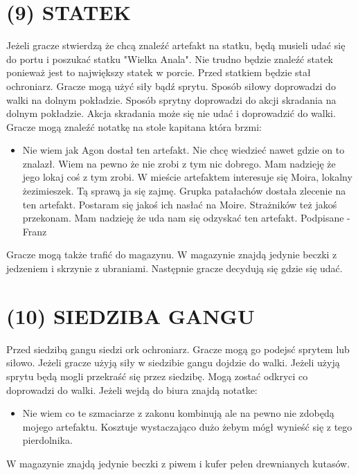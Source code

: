 \documentclass[14pt]{article}
\begin{document}
\section*{(9) STATEK}
\RaggedRight
Jeżeli gracze stwierdzą że chcą znaleźć artefakt na statku, będą musieli udać się do portu i poszukać statku "Wielka Anala". Nie trudno będzie znaleźć statek ponieważ jest to największy statek w porcie. Przed statkiem będzie stał ochroniarz. Gracze mogą użyć siły bądź sprytu. Sposób siłowy doprowadzi do walki na dolnym pokładzie. Sposób sprytny doprowadzi do akcji skradania na dolnym pokładzie. Akcja skradania może się nie udać i doprowadzić do walki. Gracze mogą znaleźć notatkę na stole kapitana która brzmi:
\begin{itemize}
    \item[] Nie wiem jak Agon dostał ten artefakt. Nie chcę wiedzieć nawet gdzie on to znalazł. Wiem na pewno że nie zrobi z tym nic dobrego. Mam nadzieję że jego lokaj coś z tym zrobi. W mieście artefaktem interesuje się Moira, lokalny żezimieszek. Tą sprawą ja się zajmę. Grupka patałachów dostała zlecenie na ten artefakt. Postaram się jakoś ich nasłać na Moire. Strażników też jakoś przekonam. Mam nadzieję że uda nam się odzyskać ten artefakt. Podpisane -Franz
\end{itemize}
Gracze mogą także trafić do magazynu. W magazynie znajdą jedynie beczki z jedzeniem i skrzynie z ubraniami. Następnie gracze decydują się gdzie się udać.

\Centering
\section*{(10) SIEDZIBA GANGU}
\RaggedRight
Przed siedzibą gangu siedzi ork ochroniarz. Gracze mogą go podejsć sprytem lub siłowo. Jeżeli gracze użyją siły w siedzibie gangu dojdzie do walki. Jeżeli użyją sprytu będą mogli przekraść się przez siedzibę. Mogą zostać odkryci co doprowadzi do walki. Jeżeli wejdą do biura znajdą notatke:
\begin{itemize}
    \item[] Nie wiem co te szmaciarze z zakonu kombinują ale na pewno nie zdobędą mojego artefaktu. Kosztuje wystaczająco dużo żebym mógł wynieść się z tego pierdolnika.
\end{itemize}
W magazynie znajdą jedynie beczki z piwem i kufer pełen drewnianych kutasów.
\newpage
\Centering
\end{document}
